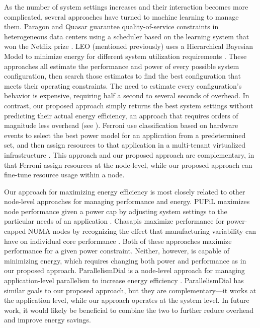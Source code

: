 As the number of system settings increases and their interaction becomes more complicated, several approaches have turned to machine learning to manage them.
Paragon \cite{Paragon} and Quasar \cite{quasar} guarantee quality-of-service constraints in heterogeneous data centers using a scheduler based on the learning system that won the Netflix prize \cite{NetflixPrize}.
LEO (mentioned previously) uses a Hierarchical Bayesian Model to minimize energy for different system utilization requirements \cite{LEO}.
These approaches all estimate the performance and power of every possible system configuration, then search those estimates to find the best configuration that meets their operating constraints.
The need to estimate every configuration's behavior is expensive, requiring half a second \cite{LEO} to several seconds \cite{Paragon} of overhead.
In contrast, our proposed approach simply returns the best system settings without predicting their actual energy efficiency, an approach that requires orders of magnitude less overhead (see ).
Ferroni \etal use classification based on hardware events to select the best power model for an application from a predetermined set, and then assign resources to that application in a multi-tenant virtualized infrastructure \cite{FerroniTACO}.
This approach and our proposed approach are complementary, in that Ferroni \etal assign resources at the node-level, while our proposed approach can fine-tune resource usage within a node.

Our approach for maximizing energy efficiency is most closely related to other node-level approaches for managing performance and energy.
PUPiL maximizes node performance given a power cap by adjusting system settings to the particular needs of an application \cite{pupil}.
Chasapis \etal maximize performance for power-capped NUMA nodes by recognizing the effect that manufacturing variability can have on individual core performance \cite{Chasapis2016}.
Both of these approaches maximize performance for a given power constraint.
Neither, however, is capable of minimizing energy, which requires changing both power and performance as in our proposed approach.
ParallelismDial is a node-level approach for managing application-level parallelism to increase energy efficiency \cite{Sridharan2013}.
ParallelismDial has similar goals to our proposed approach, but they are complementary---it works at the application level, while our approach operates at the system level.
In future work, it would likely be beneficial to combine the two to further reduce overhead and improve energy savings.



